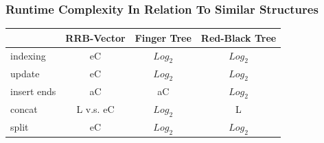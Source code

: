 \documentclass{beamer}
\begin{document}
\begin{frame}
\frametitle{Runtime Complexity In Relation To Similar Structures}

	\begin{center}
	\begin{tabular}{| l || c | c | c |}
		\hline
		& RRB-Vector & Finger Tree & Red-Black Tree\\
		\hline
		indexing & eC & $ Log_2 $ & $ Log_2 $ \\
		update & eC & $ Log_2 $ & $ Log_2 $\\
		insert ends & aC & aC & $ Log_2 $\\
		concat & L v.s. eC & $ Log_2 $ & L\\
		split & eC & $ Log_2 $ & $ Log_2 $\\
		\hline
		\end{tabular}
	\end{center}

\end{frame}

\begin{frame}




\end{frame}
\end{document}
